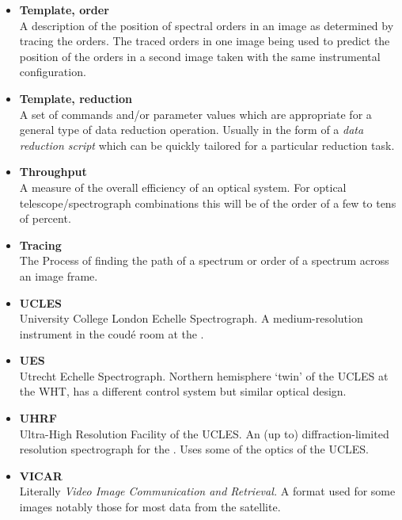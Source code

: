 \begin{itemize}
\item {\bf\label{gl_template_order}Template, order}\\
      A description of the position of spectral orders in an image
      as determined by tracing the orders.  The traced orders in one image
      being used to predict the position of the orders in a second image
      taken with the same instrumental configuration.

\item {\bf\label{gl_template_reduct}Template, reduction}\\
      A set of commands and/or parameter values which are appropriate for a
      general type of data reduction operation.  Usually in the form of a
      {\sl data reduction script} which can be quickly tailored for a
      particular reduction task.

\item {\bf\label{gl_throughput}Throughput}\\
      A measure of the overall efficiency of an optical system.
      For optical telescope/spectrograph combinations this will be of
      the order of a few to tens of percent.

\item {\bf\label{gl_tracing}Tracing}\\
      The Process of finding the path of a spectrum or order of a spectrum
      across an image frame.

\item {\bf\label{gl_ucles}UCLES}\\
      University College London Echelle Spectrograph.
      A medium-resolution instrument in the coud\'{e} room at the
      .

\item {\bf\label{gl_ues}UES}\\
      Utrecht Echelle Spectrograph.
      Northern hemisphere `twin' of the UCLES at the WHT, has a
      different control system but similar optical design.

\item {\bf\label{gl_uhrf}UHRF}\\
      Ultra-High Resolution Facility of the UCLES.  An (up to)
      diffraction-limited resolution spectrograph for the
      \@.
      Uses some of the optics of the UCLES.

\item {\bf\label{gl_vicar}VICAR}\\
      Literally {\sl Video Image Communication and Retrieval.}
      A format used for some images notably those for most data
      from the  satellite.


\end{itemize}

